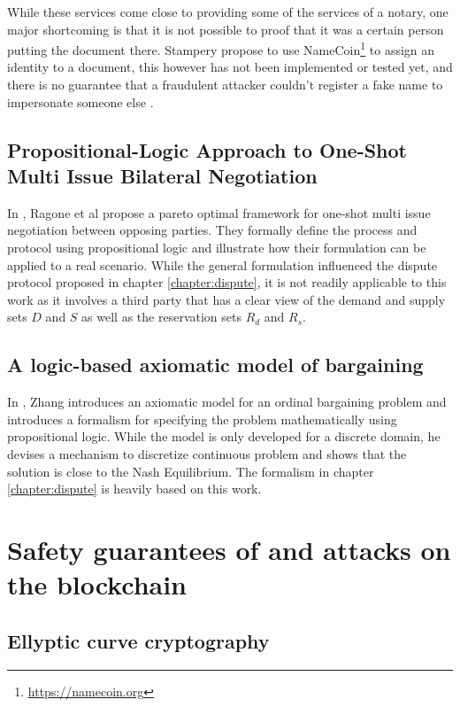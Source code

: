 \documentclass[12pt,msc,a4paper,oneside]{ucl_thesis}
\begin{document}
While these services come close to providing some of the services of a notary, one major shortcoming is that it is not possible to proof that it was a certain person putting the document there. Stampery propose to use NameCoin\footnote{\url{https://namecoin.org}} to assign an identity to a document, this however has not been implemented or tested yet, and there is no guarantee that a fraudulent attacker couldn't register a fake name to impersonate someone else \cite{notary:does_blockchain_notary_work} \cite{notary:stampery_medium}.

\section{Propositional-Logic Approach to One-Shot Multi Issue Bilateral Negotiation}
In \cite{Ragone:2006:PAO:1124566.1124569}, Ragone et al propose a pareto optimal framework for one-shot multi issue negotiation between opposing parties. They formally define the process and protocol using propositional logic and illustrate how their formulation can be applied to a real scenario. While the general formulation influenced the dispute protocol proposed in chapter \ref{chapter:dispute}, it is not readily applicable to this work as it involves a third party that has a clear view of the demand and supply sets $D$ and $S$ as well as the reservation sets $R_d$ and $R_s$.

\section{A logic-based axiomatic model of bargaining}
In \cite{DBLP:journals:corr:ZhangZ14a}, Zhang introduces an axiomatic model for an ordinal bargaining problem and introduces a formalism for specifying the problem mathematically using propositional logic. While the model is only developed for a discrete domain, he devises a mechanism to discretize continuous problem and shows that the solution is close to the Nash Equilibrium. The formalism in chapter \ref{chapter:dispute} is heavily based on this work.

\chapter{Safety guarantees of and attacks on the blockchain}

\section{Ellyptic curve cryptography}
\end{document}
